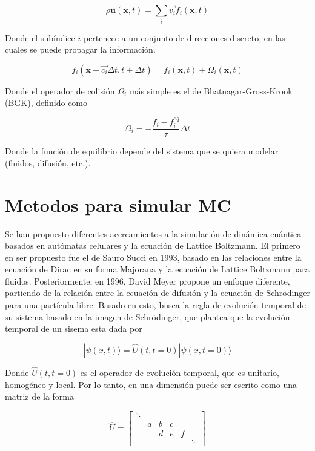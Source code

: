 \documentclass[12pts, letterpaper, twocolumn]{article}
\begin{document}
\begin{equation*}
    \rho\textbf{u}(\textbf{x}, t) = \sum_i \vec{v_i} f_i(\textbf{x}, t)
\end{equation*}

Donde el subíndice $i$ pertenece a un conjunto de direcciones discreto, en las cuales se 
puede propagar la información.


\begin{equation}\label{eq:LB}
    f_i(\textbf{x}+\vec{c_i} \Delta t, t+\Delta t) = f_i(\textbf{x}, t) + \Omega_i(\textbf{x}, t)
\end{equation}

Donde el operador de colisión $\Omega_i$ más simple es el de Bhatnagar-Gross-Krook (BGK), 
definido como 

\begin{equation*}
    \Omega_i = -\frac{f_i-f_i^{eq}}{\tau}\Delta t
\end{equation*}

Donde la función de equilibrio depende del sistema que se quiera modelar (fluidos, difusión, etc.).


\section{Metodos para simular MC}
Se han propuesto diferentes acercamientos a la simulación de dinámica cuántica basados en 
autómatas celulares y la ecuación de Lattice Boltzmann. El primero en ser propuesto fue el 
de Sauro Succi en 1993, basado en las relaciones entre la ecuación de Dirac en su forma 
Majorana y la ecuación de Lattice Boltzmann para fluidos. Posteriormente, en 1996, David 
Meyer propone un enfoque diferente, partiendo de la relación entre la ecuación de difusión 
y la ecuación de Schrödinger para una partícula libre. Basado en esto, busca la regla de 
evolución temporal de su sistema basado en la imagen de Schrödinger, que plantea que la 
evolución temporal de un sisema esta dada por

\begin{equation}\label{eq:sch_im}
    |\psi(x,t)\rangle = \hat{U}(t, t=0)|\psi(x, t=0)\rangle
\end{equation}

Donde $\hat{U}(t, t=0)$ es el operador de evolución temporal, que es unitario, homogéneo y 
local. Por lo tanto, en una dimensión puede ser escrito como una matriz de la forma

\begin{equation*}
    \hat{U} = 
    \begin{bmatrix}
        \ddots & \\
        & a & b & c \\
        & & d & e & f \\
        & & & & & \ddots 
    \end{bmatrix}
\end{equation*}
\end{document}
